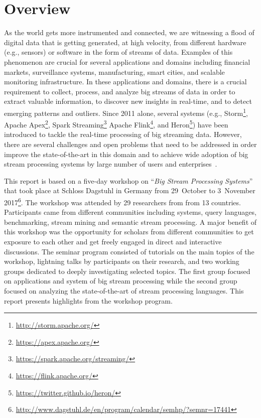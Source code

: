 \section{Overview}\label{sec:overview}

As the world gets more instrumented and connected, we are witnessing a
flood of digital data that is getting generated, at high velocity,
from different hardware (e.g., sensors) or software in the form of
streams of data. Examples of this phenomenon are crucial for several
applications and domains including financial markets, surveillance
systems, manufacturing, smart cities, and scalable monitoring
infrastructure. In these applications and domains, there is a crucial
requirement to collect, process, and analyze big streams of data in
order to extract valuable information, to discover new insights in
real-time, and to detect emerging patterns and outliers. Since 2011
alone, several systems (e.g.,
Storm\footnote{\url{http://storm.apache.org/}},
Apache Apex\footnote{\url{https://apex.apache.org/}},
Spark Streaming\footnote{\url{https://spark.apache.org/streaming/}}
Apache Flink\footnote{\url{https://flink.apache.org/}}, and
Heron\footnote{\url{https://twitter.github.io/heron/}}) have
been introduced to tackle the real-time processing of big streaming
data. However, there are several challenges and open problems that
need to be addressed in order improve the state-of-the-art in this
domain and to achieve wide adoption of big stream processing systems
by large number of users and enterprises~\cite{sakr2016big}.

This report is based on a five-day workshop on ``\emph{Big Stream
  Processing Systems}'' that took place at Schloss Dagstuhl in Germany
from 29~October to 3~November 2017\footnote{\url{http://www.dagstuhl.de/en/program/calendar/semhp/?semnr=17441}}. The workshop was attended by 29
researchers from from 13 countries. Participants came from different
communities including systems, query languages, benchmarking, stream
mining and semantic stream processing. A major benefit of this
workshop was the opportunity for scholars from different communities
to get exposure to each other and get freely engaged in direct and
interactive discussions. The seminar program consisted of tutorials on
the main topics of the workshop, lightning talks by participants on
their research, and two working groups dedicated to deeply
investigating selected topics. The first group focused on applications
and system of big stream processing while the second group focused on
analyzing the state-of-the-art of stream processing languages. This
report presents highlights from the workshop program.
